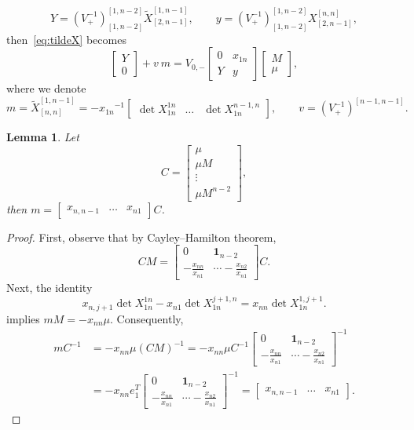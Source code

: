 \documentclass{amsart}
\newtheorem{lemma}[theorem]{Lemma}
\theoremstyle{definition}
\theoremstyle{remark}
\numberwithin{equation}{section}
\numberwithin{theorem}{section}
\def\one{\mathbf 1}
\def\wx{{\widetilde{X}}}
\begin{document}
\begin{equation}
\label{eq:YZdef}
Y= (V_+^{-1})_{[1,n-2]}^{[1,n-2]}{\wx}^{[1,n-1]}_{[2,n-1]},\qquad y=(V_+^{-1})_{[1,n-2]}^{[1,n-2]} X^{[n,n]}_{[2,n-1]},
\end{equation}
then~\eqref{eq:tildeX} becomes
\begin{equation}
\label{eq:YZ}
\begin{bmatrix}Y \\ 0 \end{bmatrix}  + 
v \ m=  V_{0,-}   \begin{bmatrix} 0 & x_{1n}\\ Y & y \end{bmatrix} \begin{bmatrix} M \\ \mu \end{bmatrix},
\end{equation}
where we denote 
\[
m =\wx_{[n,n]}^{[1,n-1]} = - {x_{1n}}^{-1} \begin{bmatrix} \det X_{1n}^{1n} & \dots & \det X_{1n}^{n-1,n}\end{bmatrix},
\qquad v=(V_+^{-1})^{[n-1,n-1]}.
\]

\begin{lemma}
\label{eq:vtomu}
Let
\[
C= \begin{bmatrix}\mu\\ \mu M \\ \vdots \\ \mu M^{n-2}\end{bmatrix},
\]
then $m=\begin{bmatrix}x_{n,n-1} &\dots & x_{n1}\end{bmatrix}C$.
\end{lemma}

\begin{proof} 
First, observe that by Cayley--Hamilton theorem,
\[
C M = \begin{bmatrix}  0 & \one_{n-2}\\- \frac{x_{nn}}{x_{n1}} & \cdots   - \frac{x_{n2}}{x_{n1}}  \end{bmatrix} C.
\]
Next, the identity
\[
x_{n, j+1} \det X_{1n}^{1n}  - x_{n1}\det X_{1n}^{j+1,n}  =  x_{nn}\det X_{1n}^{1, j+1}.
\]
implies $mM = -x_{nn} \mu$. Consequently,
\begin{align*}
 mC^{-1} &=  -x_{nn} \mu (CM)^{-1} =  -x_{nn}  \mu C^{-1}  \begin{bmatrix}  0 & \one_{n-2}\\  
 - \frac{x_{nn}}{x_{n1}} & \cdots   - \frac{x_{n2}}{x_{n1}}  \end{bmatrix} ^{-1}\\
 &  = -x_{nn}  e_1^T  \begin{bmatrix}  0 & \one_{n-2}\\   - \frac{x_{nn}}{x_{n1}} & \cdots   - \frac{x_{n2}}{x_{n1}}  \end{bmatrix} ^{-1} = \begin{bmatrix}x_{n,n-1} &\ldots & x_{n1}\end{bmatrix}.
\end{align*}
\end{proof}
\end{document}
